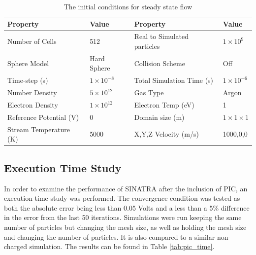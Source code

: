 \begin{table}
\caption{The initial conditions for steady state flow}
\vspace{0.3cm}

\begin{tabular}{|ll|ll|}
\hline
Property               & Value                & Property                    & Value                \\ \hline
Number of Cells        & 512                  & Real to Simulated particles & \(1 \times 10^9\)    \\
Sphere Model           & Hard Sphere          & Collision Scheme            & Off                  \\
Time-step (s)          & \(1 \times 10^{-8}\) & Total Simulation  Time (s)  & \(1 \times 10^{-6}\) \\
Number Density         & \(5 \times 10^{12}\) & Gas Type                    & Argon                \\
Electron Density       & \(1 \times 10^{12}\) & Electron Temp (eV)          & 1                    \\
Reference Potential (V)       & 0 & Domain size (m)          & \(1\times 1 \times 1\)                  \\
Stream Temperature (K) & 5000                 & X,Y,Z Velocity (m/s)        & 1000,0,0             \\ \hline
\end{tabular}

\label{tab:intialstead}

\end{table}





\subsection{Execution Time Study}

In order to examine the performance of SINATRA after the inclusion of PIC, an execution time study was performed. The convergence condition was tested as both the absolute error being less than 0.05 Volts and a less than a 5\% difference in the error from the last 50 iterations. Simulations were run keeping the same number of particles but changing the mesh size, as well as holding the mesh size and changing the number of particles. It is also compared to a similar non-charged simulation. The results can be found in Table \ref{tab:pic_time}.

